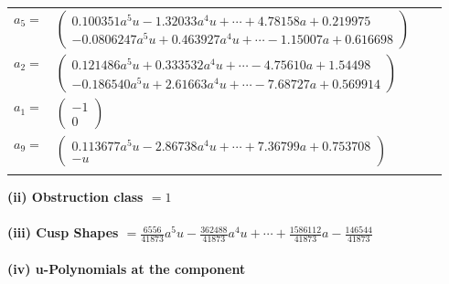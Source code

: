 \documentclass[1p]{elsarticle_modified}
\theoremstyle{definition}
\begin{document}
\begin{tabular}{m{7pt} m{180pt} m{7pt} m{180pt} }
\flushright $a_{5}=$&$\begin{pmatrix}0.100351 a^{5} u-1.32033 a^{4} u+\cdots+4.78158 a+0.219975\\-0.0806247 a^{5} u+0.463927 a^{4} u+\cdots-1.15007 a+0.616698\end{pmatrix}$ \\
\flushright $a_{2}=$&$\begin{pmatrix}0.121486 a^{5} u+0.333532 a^{4} u+\cdots-4.75610 a+1.54498\\-0.186540 a^{5} u+2.61663 a^{4} u+\cdots-7.68727 a+0.569914\end{pmatrix}$ \\
\flushright $a_{1}=$&$\begin{pmatrix}-1\\0\end{pmatrix}$ \\
\flushright $a_{9}=$&$\begin{pmatrix}0.113677 a^{5} u-2.86738 a^{4} u+\cdots+7.36799 a+0.753708\\- u\end{pmatrix}$\\&\end{tabular}
\flushleft \textbf{(ii) Obstruction class $= 1$}\\~\\
\flushleft \textbf{(iii) Cusp Shapes $= \frac{6556}{41873} a^5 u-\frac{362488}{41873} a^4 u+\cdots+\frac{1586112}{41873} a-\frac{146544}{41873}$}\\~\\
\newpage\renewcommand{\arraystretch}{1}
\flushleft \textbf{(iv) u-Polynomials at the component}\newline \\
\end{document}
